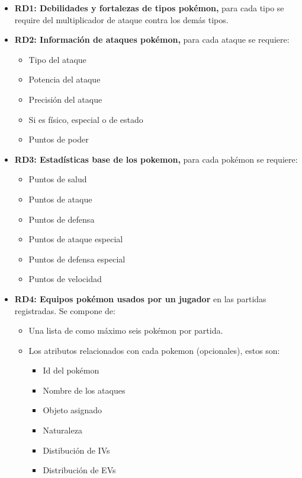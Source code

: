 
	\begin{itemize}
		\item \textbf{RD1: Debilidades y fortalezas de tipos pokémon,} para
			cada tipo se require del multiplicador de ataque contra los
			demás tipos.\\

		\item \textbf{RD2: Información de ataques pokémon,} para cada ataque
			se requiere:
			\begin{itemize}
				\item Tipo del ataque
				\item Potencia del ataque
				\item Precisión del ataque
				\item Si es físico, especial o de estado
				\item Puntos de poder
			\end{itemize}

		\item \textbf{RD3: Estadísticas base de los pokemon,} para cada pokémon
			se requiere:
			\begin{itemize}
				\item Puntos de salud
				\item Puntos de ataque
				\item Puntos de defensa
				\item Puntos de ataque especial
				\item Puntos de defensa especial
				\item Puntos de velocidad
			\end{itemize}

		\item \textbf{RD4: Equipos pokémon usados por un jugador} en las partidas
			registradas. Se compone de:
			\begin{itemize}
				\item Una lista de como máximo seis pokémon por partida.
				\item Los atributos relacionados con cada pokemon
					(opcionales), estos son:
					\begin{itemize}
						\item Id del pokémon
						\item Nombre de los ataques
						\item Objeto asignado
						\item Naturaleza
						\item Distibución de IVs
						\item Distribución de EVs
					\end{itemize}
			\end{itemize}


\end{itemize}

